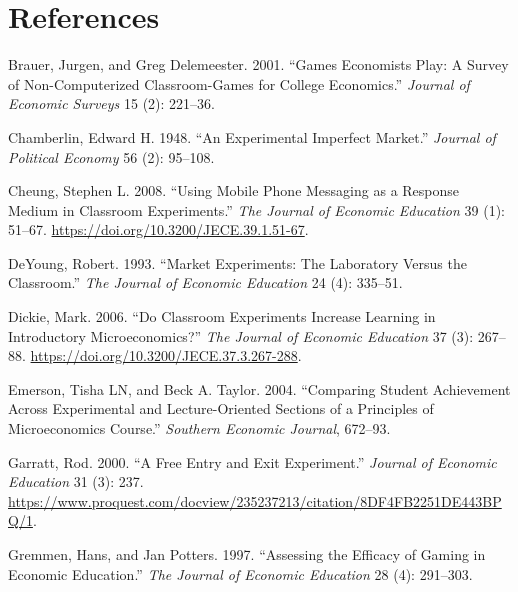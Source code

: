 \documentclass[
]{article}
\newlength{\cslhangindent}
\newlength{\cslentryspacingunit} %
\newenvironment{CSLReferences}[2] %
 {%
  \setlength{\parindent}{0pt}
  \ifodd #1
  \let\oldpar\par
  \def\par{\hangindent=\cslhangindent\oldpar}
  \fi
  \setlength{\parskip}{#2\cslentryspacingunit}
 }%
 {}
\begin{document}
\hypertarget{references}{%
\section*{References}\label{references}}

\hypertarget{refs}{}
\begin{CSLReferences}{1}{0}
\leavevmode{}%
Brauer, Jurgen, and Greg Delemeester. 2001. {``Games Economists Play:
{A} Survey of Non-Computerized Classroom-Games for College Economics.''}
\emph{Journal of Economic Surveys} 15 (2): 221--36.

\leavevmode{}%
Chamberlin, Edward H. 1948. {``An Experimental Imperfect Market.''}
\emph{Journal of Political Economy} 56 (2): 95--108.

\leavevmode{}%
Cheung, Stephen L. 2008. {``Using {Mobile} {Phone} {Messaging} as a
{Response} {Medium} in {Classroom} {Experiments}.''} \emph{The Journal
of Economic Education} 39 (1): 51--67.
\url{https://doi.org/10.3200/JECE.39.1.51-67}.

\leavevmode{}%
DeYoung, Robert. 1993. {``Market Experiments: {The} Laboratory Versus
the Classroom.''} \emph{The Journal of Economic Education} 24 (4):
335--51.

\leavevmode{}%
Dickie, Mark. 2006. {``Do {Classroom} {Experiments} {Increase}
{Learning} in {Introductory} {Microeconomics}?''} \emph{The Journal of
Economic Education} 37 (3): 267--88.
\url{https://doi.org/10.3200/JECE.37.3.267-288}.

\leavevmode{}%
Emerson, Tisha LN, and Beck A. Taylor. 2004. {``Comparing Student
Achievement Across Experimental and Lecture-Oriented Sections of a
Principles of Microeconomics Course.''} \emph{Southern Economic
Journal}, 672--93.

\leavevmode{}%
Garratt, Rod. 2000. {``A Free Entry and Exit Experiment.''}
\emph{Journal of Economic Education} 31 (3): 237.
\url{https://www.proquest.com/docview/235237213/citation/8DF4FB2251DE443BPQ/1}.

\leavevmode{}%
Gremmen, Hans, and Jan Potters. 1997. {``Assessing the Efficacy of
Gaming in Economic Education.''} \emph{The Journal of Economic
Education} 28 (4): 291--303.


\end{CSLReferences}
\end{document}
